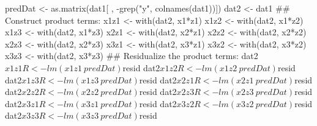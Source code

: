 \begin{Schunk}
\begin{Sinput}
 predDat <- as.matrix(dat1[ , -grep("y", colnames(dat1))])
 dat2 <- dat1
 ## Construct product terms:
 x1z1 <- with(dat2, x1*z1)
 x1z2 <- with(dat2, x1*z2)
 x1z3 <- with(dat2, x1*z3)
 x2z1 <- with(dat2, x2*z1)
 x2z2 <- with(dat2, x2*z2)
 x2z3 <- with(dat2, x2*z3)
 x3z1 <- with(dat2, x3*z1)
 x3z2 <- with(dat2, x3*z2)
 x3z3 <- with(dat2, x3*z3)
 ## Residualize the product terms:
 dat2$x1z1R <- lm(x1z1 ~ predDat)$resid
 dat2$x1z2R <- lm(x1z2 ~ predDat)$resid
 dat2$x1z3R <- lm(x1z3 ~ predDat)$resid
 dat2$x2z1R <- lm(x2z1 ~ predDat)$resid
 dat2$x2z2R <- lm(x2z2 ~ predDat)$resid
 dat2$x2z3R <- lm(x2z3 ~ predDat)$resid
 dat2$x3z1R <- lm(x3z1 ~ predDat)$resid
 dat2$x3z2R <- lm(x3z2 ~ predDat)$resid
 dat2$x3z3R <- lm(x3z3 ~ predDat)$resid
\end{Sinput}
\end{Schunk}
